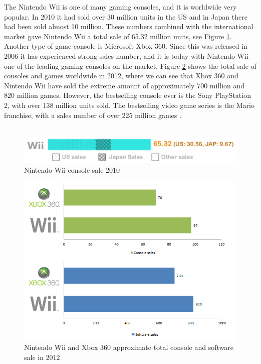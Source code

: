 The Nintendo Wii is one of many gaming consoles, and it is worldwide very popular. In 2010 it had sold over 30 million units in the US and in Japan there had been sold almost 10 million. These numbers combined with the international market gave Nintendo Wii a total sale of 65.32 million units, see Figure \ref{fig:ConsoleWarWii}. Another type of game console is Microsoft Xbox 360. Since this was released in 2006 it has experienced strong sales number, and it is today with Nintendo Wii one of the leading gaming consoles on the market. Figure \ref{fig:XboxWiiSales} shows the total sale of consoles and games worldwide in 2012, where we can see that Xbox 360 and Nintendo Wii have sold the extreme amount of approximately 700 million and 820 million games. However, the bestselling console ever is the Sony PlayStation 2, with over 138 million units sold. The bestselling video game series is the Mario franchise, with a sales number of over 225 million games \cite{statistics2012}. \\ \\

\begin{figure}[h!]
\begin{center}
\includegraphics[scale=0.5]{consolewarwii}
\caption[Nitendo Wii console sale]{Nintendo Wii console sale 2010 \cite{statistics2012}}
\label{fig:ConsoleWarWii}
\end{center}
\end{figure}

\begin{figure}[h!]
\begin{center}
\includegraphics[scale=0.7]{xboxwiisales}
\caption[Nitendo Wii and Xbox 360 sales]{Nintendo Wii and Xbox 360 approximate total console and software sale in 2012 \cite{nintendolife} \cite{microsoftxbox} \cite{vgchartzxbox} \cite{vgchartzwii} \cite{vgchartzhardware}}
\label{fig:XboxWiiSales}
\end{center}
\end{figure}

